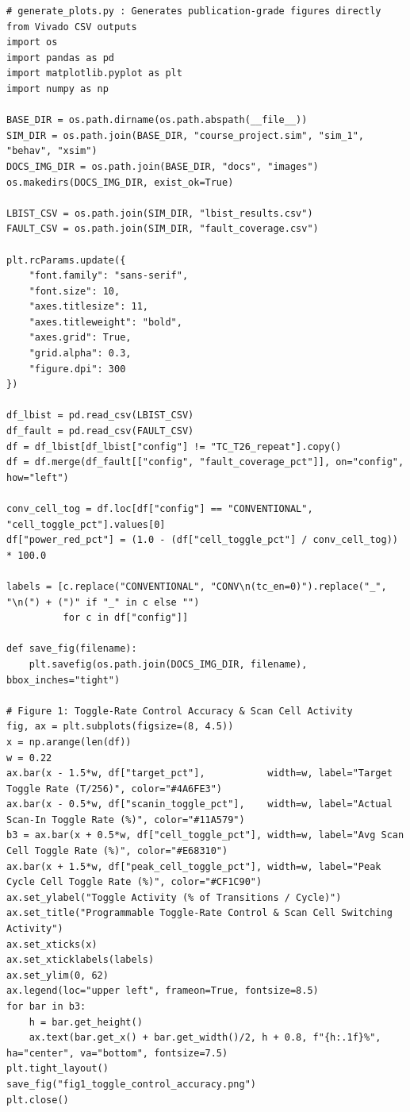 \documentclass[conference]{IEEEtran}
\begin{document}
\begin{lstlisting}[style=pythonstyle, caption={Python Plot Generation Script (\texttt{generate\_plots.py})}]
# generate_plots.py : Generates publication-grade figures directly from Vivado CSV outputs
import os
import pandas as pd
import matplotlib.pyplot as plt
import numpy as np

BASE_DIR = os.path.dirname(os.path.abspath(__file__))
SIM_DIR = os.path.join(BASE_DIR, "course_project.sim", "sim_1", "behav", "xsim")
DOCS_IMG_DIR = os.path.join(BASE_DIR, "docs", "images")
os.makedirs(DOCS_IMG_DIR, exist_ok=True)

LBIST_CSV = os.path.join(SIM_DIR, "lbist_results.csv")
FAULT_CSV = os.path.join(SIM_DIR, "fault_coverage.csv")

plt.rcParams.update({
    "font.family": "sans-serif",
    "font.size": 10,
    "axes.titlesize": 11,
    "axes.titleweight": "bold",
    "axes.grid": True,
    "grid.alpha": 0.3,
    "figure.dpi": 300
})

df_lbist = pd.read_csv(LBIST_CSV)
df_fault = pd.read_csv(FAULT_CSV)
df = df_lbist[df_lbist["config"] != "TC_T26_repeat"].copy()
df = df.merge(df_fault[["config", "fault_coverage_pct"]], on="config", how="left")

conv_cell_tog = df.loc[df["config"] == "CONVENTIONAL", "cell_toggle_pct"].values[0]
df["power_red_pct"] = (1.0 - (df["cell_toggle_pct"] / conv_cell_tog)) * 100.0

labels = [c.replace("CONVENTIONAL", "CONV\n(tc_en=0)").replace("_", "\n(") + (")" if "_" in c else "")
          for c in df["config"]]

def save_fig(filename):
    plt.savefig(os.path.join(DOCS_IMG_DIR, filename), bbox_inches="tight")

# Figure 1: Toggle-Rate Control Accuracy & Scan Cell Activity
fig, ax = plt.subplots(figsize=(8, 4.5))
x = np.arange(len(df))
w = 0.22
ax.bar(x - 1.5*w, df["target_pct"],           width=w, label="Target Toggle Rate (T/256)", color="#4A6FE3")
ax.bar(x - 0.5*w, df["scanin_toggle_pct"],    width=w, label="Actual Scan-In Toggle Rate (%)", color="#11A579")
b3 = ax.bar(x + 0.5*w, df["cell_toggle_pct"], width=w, label="Avg Scan Cell Toggle Rate (%)", color="#E68310")
ax.bar(x + 1.5*w, df["peak_cell_toggle_pct"], width=w, label="Peak Cycle Cell Toggle Rate (%)", color="#CF1C90")
ax.set_ylabel("Toggle Activity (% of Transitions / Cycle)")
ax.set_title("Programmable Toggle-Rate Control & Scan Cell Switching Activity")
ax.set_xticks(x)
ax.set_xticklabels(labels)
ax.set_ylim(0, 62)
ax.legend(loc="upper left", frameon=True, fontsize=8.5)
for bar in b3:
    h = bar.get_height()
    ax.text(bar.get_x() + bar.get_width()/2, h + 0.8, f"{h:.1f}%", ha="center", va="bottom", fontsize=7.5)
plt.tight_layout()
save_fig("fig1_toggle_control_accuracy.png")
plt.close()


\end{lstlisting}
\end{document}
